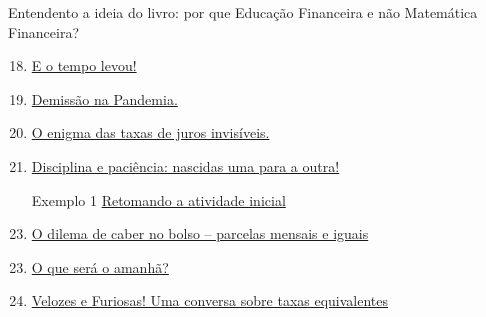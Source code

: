 \begin{apresentacao}{Entendento a ideia do livro: por que Educação Financeira e não Matemática Financeira?}
\begin{multicols}{2}
\begin{enumerate}[label=Atividade \arabic* --, wide]\setcounter{enumi}{17}
\item \hyperref[fin-ativ-18]{E o tempo levou!}
\end{enumerate}


\begin{enumerate}[label=Atividade \arabic* --, wide]\setcounter{enumi}{18}
\item \hyperref[fin-ativ-19]{Demissão na Pandemia.}
\item \hyperref[fin-ativ-20]{O enigma das taxas de juros invisíveis.}
\end{enumerate}
\vspace{1em}

\begin{enumerate}[label=Atividade \arabic* --, wide]\setcounter{enumi}{20}
\item \hyperref[fin-ativ-21]{Disciplina e paciência: nascidas uma para a outra!}
\end{enumerate}

\begin{enumerate}[label=Atividade \arabic* --, wide]\setcounter{enumi}{21}
\item[Exemplo 1] \hyperref[fin-exemp-1]{Retomando a atividade inicial}
\item \hyperref[fin-ativ-22]{O dilema de caber no bolso -- parcelas mensais e iguais}
\end{enumerate}

\begin{enumerate}[label=Atividade \arabic* --, wide]\setcounter{enumi}{22}
\item \hyperref[fin-ativ-23]{O que será o amanhã?}
\end{enumerate}
\vspace{1em}

\begin{enumerate}[label=Atividade \arabic* --, wide]\setcounter{enumi}{23}
\item \hyperref[fin-ativ-24]{Velozes e Furiosas! Uma conversa sobre taxas equivalentes}
\end{enumerate}


\end{multicols}
\end{apresentacao}
